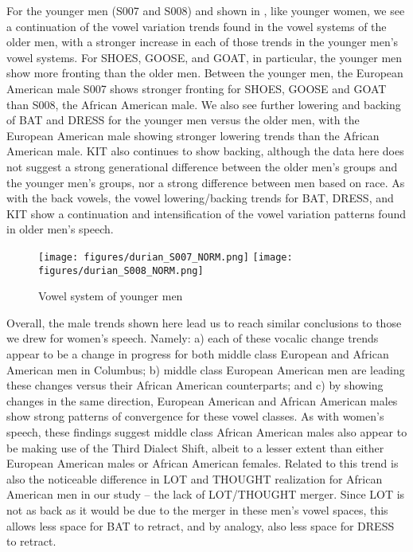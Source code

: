 \documentclass[output=paper,colorlinks,citecolor=brown]{langscibook}
\begin{document}
For the younger men (S007 and S008) and shown in , like younger women, we see a continuation of the vowel variation trends found in the vowel systems of the older men, with a stronger increase in each of those trends in the younger men's vowel systems. For SHOES, GOOSE, and GOAT, in particular, the younger men show more fronting than the older men. Between the younger men, the European American male S007 shows stronger fronting for SHOES, GOOSE and GOAT than S008, the African American male. We also see further lowering and backing of BAT and DRESS for the younger men versus the older men, with the European American male showing stronger lowering trends than the African American male. KIT also continues to show backing, although the data here does not suggest a strong generational difference between the older men's groups and the younger men's groups, nor a strong difference between men based on race. As with the back vowels, the vowel lowering/backing trends for BAT, DRESS, and KIT show a continuation and intensification of the vowel variation patterns found in older men's speech.

\begin{figure}
  \subfigure%
  {
 \texttt{[image: figures/durian\_S007\_NORM.png]}
 }
  \subfigure%
  {
 \texttt{[image: figures/durian\_S008\_NORM.png]}
 }
\caption{Vowel system of younger men}
\label{fig:durian:youngmen}
\end{figure}

Overall, the male trends shown here lead us to reach similar conclusions to those we drew for women's speech. Namely: a) each of these vocalic change trends appear to be a change in progress for both middle class European and African American men in Columbus; b) middle class European American men are leading these changes versus their African American counterparts; and c) by showing changes in the same direction, European American and African American males show strong patterns of convergence for these vowel classes. As with women's speech, these findings suggest middle class African American males also appear to be making use of the Third Dialect Shift, albeit to a lesser extent than either European American males or African American females. Related to this trend is also the noticeable difference in LOT and THOUGHT realization for African American men in our study -- the lack of LOT/THOUGHT merger. Since LOT is not as back as it would be due to the merger in these men's vowel spaces, this allows less space for BAT to retract, and by analogy, also less space for DRESS to retract.
\end{document}
